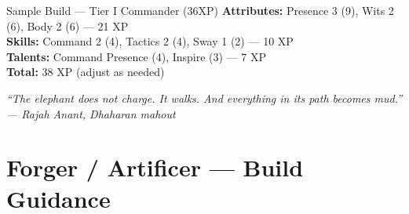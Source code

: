 \documentclass[10pt]{article}
\begin{document}
\begin{Form}
\begin{minipage}[t]{0.48\linewidth}
    \vspace{0.5em}
    
    \begin{charbox}{Sample Build --- Tier I Commander (36XP)}
        \textbf{Attributes:} Presence 3 (9), Wits 2 (6), Body 2 (6) --- 21 XP\\
        \textbf{Skills:} Command 2 (4), Tactics 2 (4), Sway 1 (2) --- 10 XP\\
        \textbf{Talents:} Command Presence (4), Inspire (3) --- 7 XP\\
        \textbf{Total:} 38 XP (adjust as needed)
    \end{charbox}
\end{minipage}

\vspace{0.5em}
\begin{center}
    {\small\sffamily\itshape ``The elephant does not charge. It walks. And everything in its path becomes mud.'' --- Rajah Anant, Dhaharan mahout}
    
    \vspace{0.3em}
    \PushButton[name=calcBtnCommander, onclick={this.calculateCommander();}, borderwidth=1pt, bordercolor=blue, backgroundcolor=sectionbg, color=white, width=4cm, height=0.6cm]{\textbf{\textcolor{white}{Calculate Totals}}}
    \quad
    \PushButton[name=resetBtnCommander, onclick={this.resetForm();}, borderwidth=1pt, bordercolor=red!60, backgroundcolor=red!40, color=white, width=4cm, height=0.6cm]{\textbf{\textcolor{white}{Reset Form}}}
\end{center}

\end{Form}
\newpage


\section*{Forger / Artificer --- Build Guidance}
\end{document}
